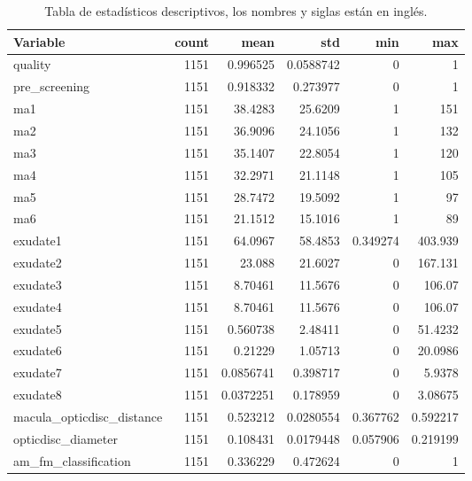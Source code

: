 \begin{table}[htbp]
\centering
\caption{Tabla de estadísticos descriptivos, los nombres y siglas están en inglés.}
\small
\begin{tabular}{lrrrrr}
\toprule
Variable & count & mean & std & min & max \\
\midrule
quality                    & 1151 & 0.996525  & 0.0588742 & 0        & 1        \\
pre\_screening             & 1151 & 0.918332  & 0.273977  & 0        & 1        \\
ma1                        & 1151 & 38.4283   & 25.6209   & 1        & 151      \\
ma2                        & 1151 & 36.9096   & 24.1056   & 1        & 132      \\
ma3                        & 1151 & 35.1407   & 22.8054   & 1        & 120      \\
ma4                        & 1151 & 32.2971   & 21.1148   & 1        & 105      \\
ma5                        & 1151 & 28.7472   & 19.5092   & 1        & 97       \\
ma6                        & 1151 & 21.1512   & 15.1016   & 1        & 89       \\
exudate1                   & 1151 & 64.0967   & 58.4853   & 0.349274 & 403.939  \\
exudate2                   & 1151 & 23.088    & 21.6027   & 0        & 167.131  \\
exudate3                   & 1151 & 8.70461   & 11.5676   & 0        & 106.07   \\
exudate4                   & 1151 & 8.70461   & 11.5676   & 0        & 106.07   \\
exudate5                   & 1151 & 0.560738  & 2.48411   & 0        & 51.4232  \\
exudate6                   & 1151 & 0.21229   & 1.05713   & 0        & 20.0986  \\
exudate7                   & 1151 & 0.0856741 & 0.398717  & 0        & 5.9378   \\
exudate8                   & 1151 & 0.0372251 & 0.178959  & 0        & 3.08675  \\
macula\_opticdisc\_distance & 1151 & 0.523212  & 0.0280554 & 0.367762 & 0.592217 \\
opticdisc\_diameter        & 1151 & 0.108431  & 0.0179448 & 0.057906 & 0.219199 \\
am\_fm\_classification     & 1151 & 0.336229  & 0.472624  & 0        & 1        \\
\bottomrule
\end{tabular}
\end{table}

